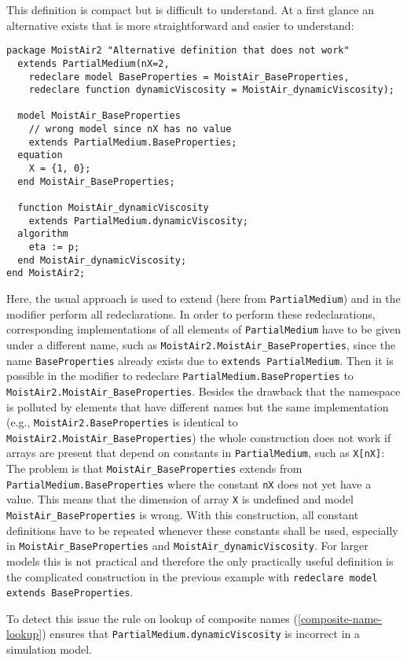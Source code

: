 \begin{nonnormative}
This definition is compact but is difficult to understand.
At a first glance an alternative exists that is more straightforward and easier to understand:
\begin{lstlisting}[language=modelica]
package MoistAir2 "Alternative definition that does not work"
  extends PartialMedium(nX=2,
    redeclare model BaseProperties = MoistAir_BaseProperties,
    redeclare function dynamicViscosity = MoistAir_dynamicViscosity);

  model MoistAir_BaseProperties
    // wrong model since nX has no value
    extends PartialMedium.BaseProperties;
  equation
    X = {1, 0};
  end MoistAir_BaseProperties;

  function MoistAir_dynamicViscosity
    extends PartialMedium.dynamicViscosity;
  algorithm
    eta := p;
  end MoistAir_dynamicViscosity;
end MoistAir2;
\end{lstlisting}

Here, the usual approach is used to extend (here from \lstinline!PartialMedium!) and in the modifier perform all redeclarations.
In order to perform these redeclarations, corresponding implementations of all elements of \lstinline!PartialMedium! have to be given under a different name, such as \lstinline!MoistAir2.MoistAir_BaseProperties!, since the name \lstinline!BaseProperties! already exists due to \lstinline!extends PartialMedium!.
Then it is possible in the modifier to redeclare \lstinline!PartialMedium.BaseProperties! to \lstinline!MoistAir2.MoistAir_BaseProperties!.
Besides the drawback that the namespace is polluted by elements that have different names but the same implementation (e.g., \lstinline!MoistAir2.BaseProperties! is identical to \lstinline!MoistAir2.MoistAir_BaseProperties!) the whole construction does not work if arrays are present that depend on constants in \lstinline!PartialMedium!, such as \lstinline!X[nX]!:
The problem is that \lstinline!MoistAir_BaseProperties! extends from \lstinline!PartialMedium.BaseProperties! where the constant \lstinline!nX! does not yet have a value.
This means that the dimension of array \lstinline!X! is undefined and model \lstinline!MoistAir_BaseProperties! is wrong.
With this construction, all constant definitions have to be repeated whenever these constants shall be used, especially in \lstinline!MoistAir_BaseProperties! and \lstinline!MoistAir_dynamicViscosity!.
For larger models this is not practical and therefore the only practically useful definition is the complicated construction in the previous example with \lstinline!redeclare model extends BaseProperties!.

To detect this issue the rule on lookup of composite names (\cref{composite-name-lookup}) ensures that \lstinline!PartialMedium.dynamicViscosity! is incorrect in a simulation model.
\end{nonnormative}


